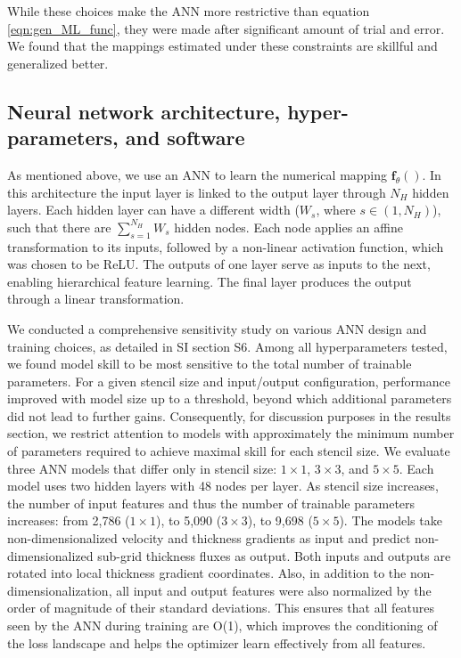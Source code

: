 \documentclass[draft]{agujournal2019}
\begin{document}
While these choices make the ANN more restrictive than equation \ref{eqn:gen_ML_func}, they were made after significant amount of trial and error. We found that the mappings estimated under these constraints are skillful and generalized better. %


\subsection{Neural network architecture, hyper-parameters, and software}
As mentioned above, we use an ANN to learn the numerical mapping $\mathbf{f}_\theta()$. In this architecture the input layer is linked to the output layer through $N_H$ hidden layers. Each hidden layer can have a different width ($W_s$, where $s \in (1, N_H)$), such that there are $\sum_{s=1}^{N_H} W_s$ hidden nodes. Each node applies an affine transformation to its inputs, followed by a non-linear activation function, which was chosen to be ReLU. The outputs of one layer serve as inputs to the next, enabling hierarchical feature learning. The final layer produces the output through a linear transformation.


We conducted a comprehensive sensitivity study on various ANN design and training choices, as detailed in SI section S6. Among all hyperparameters tested, we found model skill to be most sensitive to the total number of trainable parameters. For a given stencil size and input/output configuration, performance improved with model size up to a threshold, beyond which additional parameters did not lead to further gains. Consequently, for discussion purposes in the results section, we restrict attention to models with approximately the minimum number of parameters required to achieve maximal skill for each stencil size. We evaluate three ANN models that differ only in stencil size: $1\times1$, $3\times3$, and $5\times5$. Each model uses two hidden layers with 48 nodes per layer. As stencil size increases, the number of input features and thus the number of trainable parameters increases: from 2,786 ($1\times1$), to 5,090 ($3\times3$), to 9,698 ($5\times5$).
The models take non-dimensionalized velocity and thickness gradients as input and predict non-dimensionalized sub-grid thickness fluxes as output. Both inputs and outputs are rotated into local thickness gradient coordinates. Also, in addition to the non-dimensionalization, all input and output features were also normalized by the order of magnitude of their standard deviations. This ensures that all features seen by the ANN during training are O(1), which improves the conditioning of the loss landscape and helps the optimizer learn effectively from all features. 
\end{document}
